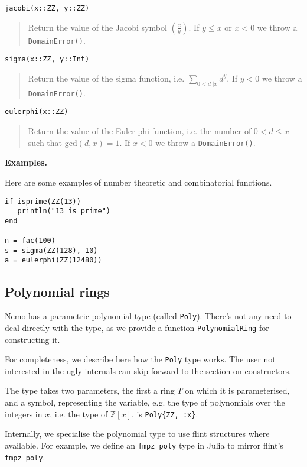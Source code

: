 \documentclass[a4paper,10pt]{article}
\newcommand{\Z}{\mathbb{Z}}
\newcommand{\code}{\lstinline}
\newcommand{\desc}[1]{\vspace{-3mm}\begin{quote}#1\end{quote}}
\newcommand{\ljk}[2]{\left(\frac{#1}{#2}\right)}
\begin{document}
{{{\begin{lstlisting}
jacobi(x::ZZ, y::ZZ)
\end{lstlisting}

\desc{Return the value of the Jacobi symbol $\ljk{x}{y}$. If $y \leq x$ or $x < 0$ we
throw a \code{DomainError()}.}

\begin{lstlisting}
sigma(x::ZZ, y::Int)
\end{lstlisting}

\desc{Return the value of the sigma function, i.e. $\sum_{0 < d \;| x} d^y$. If $y < 0$
we throw a \code{DomainError()}.}

\begin{lstlisting}
eulerphi(x::ZZ)
\end{lstlisting}

\desc{Return the value of the Euler phi function, i.e. the number of $0 < d \leq x$ such
that gcd$(d, x) = 1$. If $x < 0$ we throw a \code{DomainError()}.}

\textbf{Examples.}

Here are some examples of number theoretic and combinatorial functions.

\begin{lstlisting}
if isprime(ZZ(13))
   println("13 is prime")
end

n = fac(100)
s = sigma(ZZ(128), 10)
a = eulerphi(ZZ(12480))
\end{lstlisting}

\subsection{Polynomial rings}

Nemo has a parametric polynomial type (called \code{Poly}). There's not any need to deal
directly with the type, as we provide a function \code{PolynomialRing} for constructing
it.

For completeness, we describe here how the \code{Poly} type works. The user not interested
in the ugly internals can skip forward to the section on constructors.

The type takes two parameters, the first a ring $T$ on which it is parameterised, and a
symbol, representing the variable, e.g. the type of polynomials over the integers in $x$, 
i.e. the type of $\Z[x]$, is \code|Poly{ZZ, :x}|.

Internally, we specialise the polynomial type to use flint structures where available.
For example, we define an \code{fmpz_poly} type in Julia to mirror flint's \code{fmpz_poly}.

}}}
\end{document}
